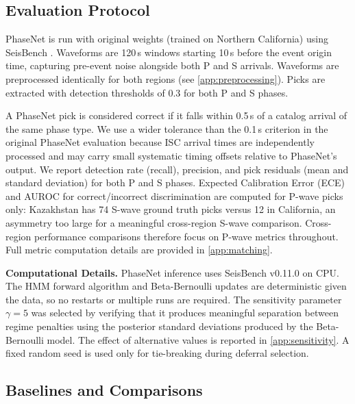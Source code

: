 \subsection{Evaluation Protocol}
\label{sec:eval_protocol}

PhaseNet is run with original weights (trained on Northern California) using SeisBench 
\citep{woollam2022seisbench}. Waveforms are 120\,s windows starting 10\,s before the event origin time, capturing pre-event noise alongside both P and S arrivals. Waveforms are preprocessed identically for both regions (see \cref{app:preprocessing}). 
Picks are extracted with detection thresholds of 0.3 for both P and S phases.

\medskip
A PhaseNet pick is considered correct if it falls within 0.5\,s of a catalog arrival 
of the same phase type. We use a wider tolerance than the 0.1\,s criterion in the original PhaseNet evaluation \citep{zhu2019phasenet} because ISC arrival times are independently processed and may carry small systematic timing offsets relative to PhaseNet's output. We report detection rate (recall), precision, and pick residuals (mean and standard deviation) for both P and S phases. Expected Calibration Error (ECE) and AUROC for 
correct/incorrect discrimination are computed for P-wave picks only: Kazakhstan has 74 S-wave ground truth picks versus 12 in California, an asymmetry too large for a 
meaningful cross-region S-wave comparison. Cross-region performance comparisons therefore focus on P-wave metrics throughout. Full metric computation details are provided in \cref{app:matching}.

\medskip
\textbf{Computational Details.} PhaseNet inference uses SeisBench v0.11.0 on CPU. The HMM forward algorithm and Beta-Bernoulli updates are deterministic given the data, so no restarts or multiple runs are required. The sensitivity parameter $\gamma = 5$ was selected by verifying that it produces meaningful separation between regime penalties using the posterior standard deviations produced by the Beta-Bernoulli model. The effect of alternative 
values is reported in \cref{app:sensitivity}. A fixed random seed is used only for tie-breaking during deferral selection.

\subsection{Baselines and Comparisons}
\label{sec:baselines}

